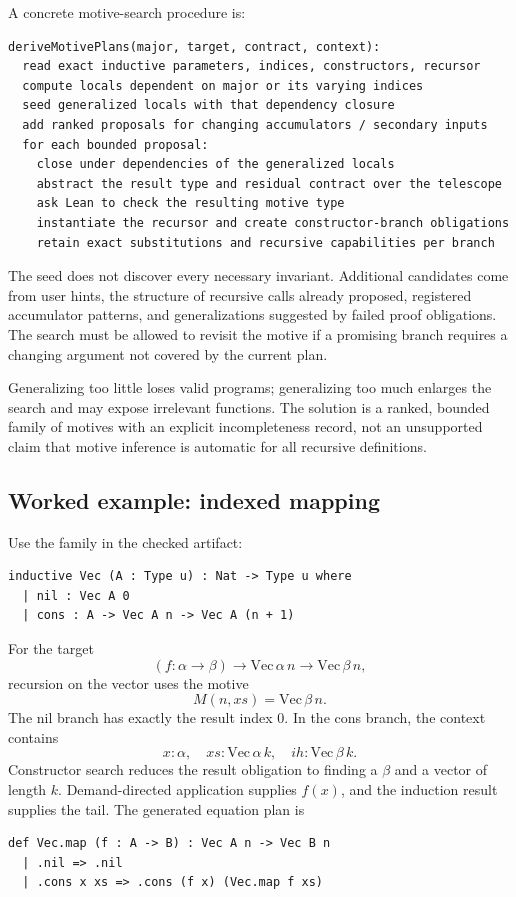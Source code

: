 \documentclass[11pt,a4paper]{article}
\theoremstyle{remark}
\begin{document}
A concrete motive-search procedure is:
\begin{lstlisting}
deriveMotivePlans(major, target, contract, context):
  read exact inductive parameters, indices, constructors, recursor
  compute locals dependent on major or its varying indices
  seed generalized locals with that dependency closure
  add ranked proposals for changing accumulators / secondary inputs
  for each bounded proposal:
    close under dependencies of the generalized locals
    abstract the result type and residual contract over the telescope
    ask Lean to check the resulting motive type
    instantiate the recursor and create constructor-branch obligations
    retain exact substitutions and recursive capabilities per branch
\end{lstlisting}

The seed does not discover every necessary invariant. Additional candidates come from user hints, the structure of recursive calls already proposed, registered accumulator patterns, and generalizations suggested by failed proof obligations. The search must be allowed to revisit the motive if a promising branch requires a changing argument not covered by the current plan.

Generalizing too little loses valid programs; generalizing too much enlarges the search and may expose irrelevant functions. The solution is a ranked, bounded family of motives with an explicit incompleteness record, not an unsupported claim that motive inference is automatic for all recursive definitions.

\subsection{Worked example: indexed mapping}

Use the family in the checked artifact:
\begin{lstlisting}
inductive Vec (A : Type u) : Nat -> Type u where
  | nil : Vec A 0
  | cons : A -> Vec A n -> Vec A (n + 1)
\end{lstlisting}
For the target
\[
 (f:\alpha\to\beta)\to\mathrm{Vec}\,\alpha\,n
                         \to\mathrm{Vec}\,\beta\,n,
\]
recursion on the vector uses the motive
\[
 M(n,xs)=\mathrm{Vec}\,\beta\,n.
\]
The nil branch has exactly the result index $0$. In the cons branch, the context contains
\[
 x:\alpha,\quad xs:\mathrm{Vec}\,\alpha\,k,
 \quad ih:\mathrm{Vec}\,\beta\,k.
\]
Constructor search reduces the result obligation to finding a $\beta$ and a vector of length $k$. Demand-directed application supplies $f(x)$, and the induction result supplies the tail. The generated equation plan is
\begin{lstlisting}
def Vec.map (f : A -> B) : Vec A n -> Vec B n
  | .nil => .nil
  | .cons x xs => .cons (f x) (Vec.map f xs)
\end{lstlisting}
\end{document}
